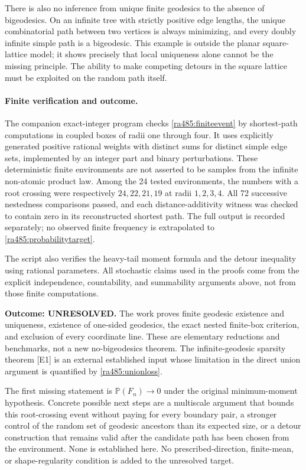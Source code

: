 \documentclass[11pt]{article}
\begin{document}
There is also no inference from unique finite geodesics to the absence
of bigeodesics. On an infinite tree with strictly positive edge lengths,
the unique combinatorial path between two vertices is always minimizing,
and every doubly infinite simple path is a bigeodesic. This example is
outside the planar square-lattice model; it shows precisely that local
uniqueness alone cannot be the missing principle. The ability to make
competing detours in the square lattice must be exploited on the random
path itself.

\paragraph{Finite verification and outcome.}
The companion exact-integer program checks
\eqref{ra485:finiteevent} by shortest-path computations in coupled boxes
of radii one through four. It uses explicitly generated positive rational
weights with distinct sums for distinct simple edge sets, implemented
by an integer part and binary perturbations. These deterministic finite
environments are not asserted to be samples from the infinite non-atomic
product law. Among the 24 tested environments, the numbers with a root
crossing were respectively $24,22,21,19$ at radii $1,2,3,4$.
All 72 successive nestedness comparisons passed, and each distance-additivity
witness was checked to contain zero in its reconstructed shortest path.
The full output is recorded separately; no observed finite frequency is
extrapolated to \eqref{ra485:probabilitytarget}.

The script also verifies the heavy-tail moment formula and the detour
inequality using rational parameters. All stochastic claims used in the
proofs come from the explicit independence, countability, and summability
arguments above, not from those finite computations.

\textbf{Outcome: UNRESOLVED.} The work proves finite geodesic existence
and uniqueness, existence of one-sided geodesics, the exact nested
finite-box criterion, and exclusion of every coordinate line. These are
elementary reductions and benchmarks, not a new no-bigeodesics theorem.
The infinite-geodesic sparsity theorem [E1] is an external established
input whose limitation in the direct union argument is quantified by
\eqref{ra485:unionloss}.

The first missing statement is
$\mathbb P(F_n)\to0$ under the original minimum-moment hypothesis.
Concrete possible next steps are a multiscale argument that bounds this
root-crossing event without paying for every boundary pair, a stronger
control of the random set of geodesic ancestors than its expected size,
or a detour construction that remains valid after the candidate path
has been chosen from the environment. None is established here.
No prescribed-direction, finite-mean, or shape-regularity condition is
added to the unresolved target.
\end{document}
